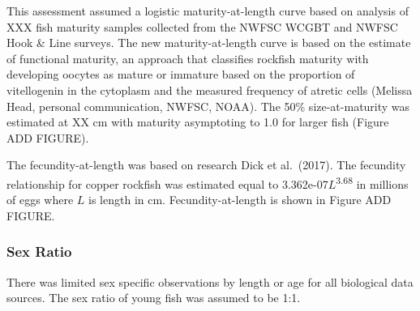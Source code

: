 \documentclass[11pt,
  english,
  a4paper,
]{article}
\begin{document}
\leavevmode\tagmcend\tagstructend\par


This assessment assumed a logistic maturity-at-length curve based on analysis of XXX fish maturity samples collected from the NWFSC WCGBT and NWFSC Hook \& Line surveys. The new maturity-at-length curve is based on the estimate of functional maturity, an approach that classifies rockfish maturity with developing oocytes as mature or immature based on the proportion of vitellogenin in the cytoplasm and the measured frequency of atretic cells (Melissa Head, personal communication, NWFSC, NOAA). The 50\% size-at-maturity was estimated at XX cm with maturity asymptoting to 1.0 for larger fish (Figure ADD FIGURE).

\leavevmode\tagmcend\tagstructend\par


The fecundity-at-length was based on research Dick et al.~{(2017)\leavevmode\tagmcend\tagstructend}. The fecundity relationship for copper rockfish was estimated equal to 3.362e-07{\(L\)\leavevmode\tagmcend\tagstructend}\textsuperscript{3.68} in millions of eggs where {\(L\)\leavevmode\tagmcend\tagstructend} is length in cm. Fecundity-at-length is shown in Figure ADD FIGURE.

\leavevmode\tagmcend\tagstructend\par


\hypertarget{sex-ratio}{%
\subsubsection{Sex Ratio}\label{sex-ratio}}

\leavevmode\tagmcend\tagstructend


There was limited sex specific observations by length or age for all biological data sources. The sex ratio of young fish was assumed to be 1:1.

\leavevmode\tagmcend\tagstructend\par

\end{document}

